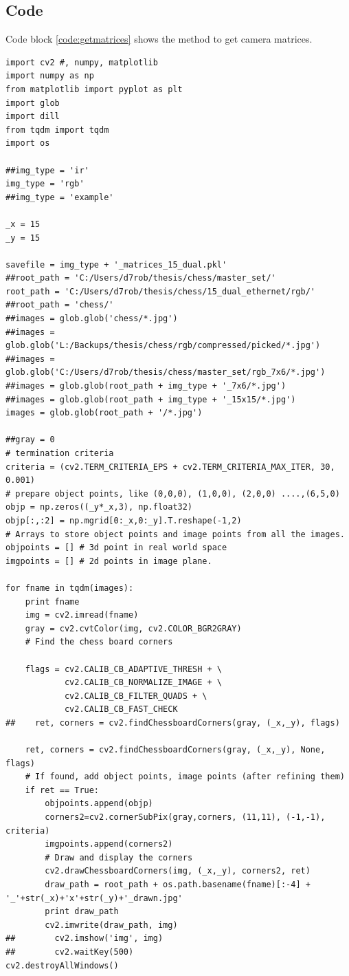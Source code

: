 \begin{appendices}
\chapter{Code}

Code block \ref{code:getmatrices} shows the method to get camera matrices.

\begin{lstlisting}
import cv2 #, numpy, matplotlib
import numpy as np
from matplotlib import pyplot as plt
import glob
import dill
from tqdm import tqdm
import os

##img_type = 'ir'
img_type = 'rgb'
##img_type = 'example'

_x = 15
_y = 15

savefile = img_type + '_matrices_15_dual.pkl'
##root_path = 'C:/Users/d7rob/thesis/chess/master_set/'
root_path = 'C:/Users/d7rob/thesis/chess/15_dual_ethernet/rgb/'
##root_path = 'chess/'
##images = glob.glob('chess/*.jpg')
##images = glob.glob('L:/Backups/thesis/chess/rgb/compressed/picked/*.jpg')
##images = glob.glob('C:/Users/d7rob/thesis/chess/master_set/rgb_7x6/*.jpg')
##images = glob.glob(root_path + img_type + '_7x6/*.jpg')
##images = glob.glob(root_path + img_type + '_15x15/*.jpg')
images = glob.glob(root_path + '/*.jpg')

##gray = 0
# termination criteria
criteria = (cv2.TERM_CRITERIA_EPS + cv2.TERM_CRITERIA_MAX_ITER, 30, 0.001)
# prepare object points, like (0,0,0), (1,0,0), (2,0,0) ....,(6,5,0)
objp = np.zeros((_y*_x,3), np.float32)
objp[:,:2] = np.mgrid[0:_x,0:_y].T.reshape(-1,2)
# Arrays to store object points and image points from all the images.
objpoints = [] # 3d point in real world space
imgpoints = [] # 2d points in image plane.

for fname in tqdm(images):
    print fname
    img = cv2.imread(fname)
    gray = cv2.cvtColor(img, cv2.COLOR_BGR2GRAY)
    # Find the chess board corners
    
    flags = cv2.CALIB_CB_ADAPTIVE_THRESH + \
            cv2.CALIB_CB_NORMALIZE_IMAGE + \
            cv2.CALIB_CB_FILTER_QUADS + \
            cv2.CALIB_CB_FAST_CHECK
##    ret, corners = cv2.findChessboardCorners(gray, (_x,_y), flags)

    ret, corners = cv2.findChessboardCorners(gray, (_x,_y), None, flags)
    # If found, add object points, image points (after refining them)
    if ret == True:
        objpoints.append(objp)
        corners2=cv2.cornerSubPix(gray,corners, (11,11), (-1,-1), criteria)
        imgpoints.append(corners2)
        # Draw and display the corners
        cv2.drawChessboardCorners(img, (_x,_y), corners2, ret)
        draw_path = root_path + os.path.basename(fname)[:-4] + '_'+str(_x)+'x'+str(_y)+'_drawn.jpg'
        print draw_path
        cv2.imwrite(draw_path, img)
##        cv2.imshow('img', img)
##        cv2.waitKey(500)
cv2.destroyAllWindows()


\end{lstlisting}
\end{appendices}
